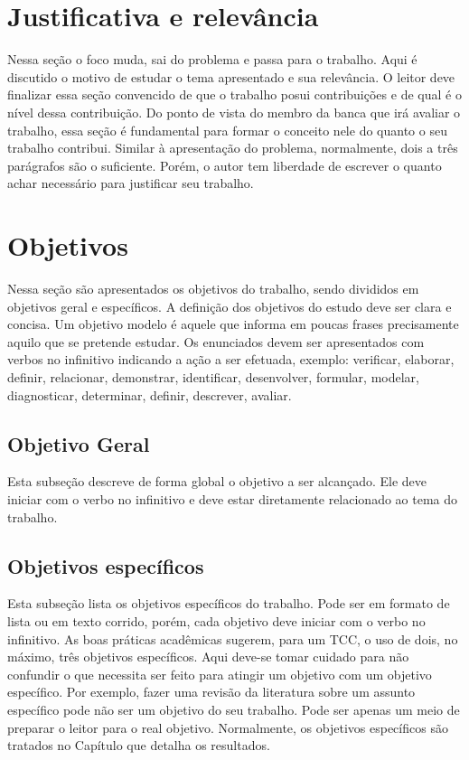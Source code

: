 \section{Justificativa e relevância}

Nessa seção o foco muda, sai do problema e passa para o trabalho.
Aqui é discutido o motivo de estudar o tema apresentado e sua relevância.
O leitor deve finalizar essa seção convencido de que o trabalho posui contribuições e de qual é o nível dessa contribuição.
Do ponto de vista do membro da banca que irá avaliar o trabalho, essa seção é fundamental para formar o conceito nele do quanto o seu trabalho contribui.
Similar à apresentação do problema, normalmente, dois a três parágrafos são o suficiente.
Porém, o autor tem liberdade de escrever o quanto achar necessário para justificar seu trabalho.

\section{Objetivos}

Nessa seção são apresentados os objetivos do trabalho, sendo divididos em objetivos geral e específicos.
A definição dos objetivos do estudo deve ser clara e concisa.
Um objetivo modelo é aquele que informa em poucas frases precisamente aquilo que se pretende estudar.
Os enunciados devem ser apresentados com verbos no infinitivo indicando a ação a ser efetuada, exemplo: verificar, elaborar, definir, relacionar, demonstrar, identificar, desenvolver, formular, modelar, diagnosticar, determinar, definir, descrever, avaliar.

\subsection{Objetivo Geral}

Esta subseção descreve de forma global o objetivo a ser alcançado.
Ele deve iniciar com o verbo no infinitivo e deve estar diretamente relacionado ao tema do trabalho.

\subsection{Objetivos específicos}

Esta subseção lista os objetivos específicos do trabalho.
Pode ser em formato de lista ou em texto corrido, porém, cada objetivo deve iniciar com o verbo no infinitivo.
As boas práticas acadêmicas sugerem, para um TCC, o uso de dois, no máximo, três objetivos específicos.
Aqui deve-se tomar cuidado para não confundir o que necessita ser feito para atingir um objetivo com um objetivo específico.
Por exemplo, fazer uma revisão da literatura sobre um assunto específico pode não ser um objetivo do seu trabalho.
Pode ser apenas um meio de preparar o leitor para o real objetivo.
Normalmente, os objetivos específicos são tratados no Capítulo que detalha os resultados.


